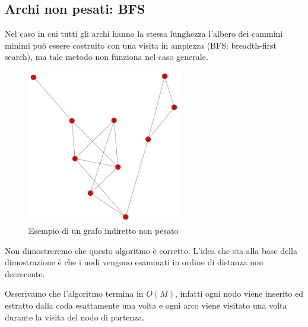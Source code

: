 \documentclass[a4paper,10pt]{amsbook}
\theoremstyle{plain}
\theoremstyle{definition}
\theoremstyle{remark}
\newcommand{\pa}[1]{\left(#1\right)}
\begin{document}
\subsection{Archi non pesati: BFS}

Nel caso in cui tutti gli archi hanno la stessa lunghezza l'albero dei
cammini minimi può essere costruito con una visita in ampiezza (BFS:
breadth-first search), ma tale metodo non funziona nel caso generale.

\begin{figure}[h]
  \centering
  \includegraphics[width=0.6\textwidth]{preBFS}
  \caption{Esempio di un grafo indiretto non pesato}
  \label{fig:preBFS}
\end{figure}


\begin{figure}[H]
  \begin{algorithmic}
      
    \EndFor
            
      
    \EndIf
    \EndFor
    \EndWhile
  \end{algorithmic}
\label{fig:BFScode}
\end{figure}
Non dimostreremo che questo algoritmo \`e corretto. L'idea che sta
alla base della dimostrazione \`e che i nodi vengono esaminati in
ordine di distanza non decrecente.

Osserivamo che l'algoritmo termina in $O\pa{M}$, infatti ogni nodo
viene inserito ed estratto dalla coda esattamente una volta e ogni
arco viene visitato una volta durante la visita del nodo di partenza.
\end{document}
